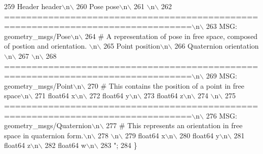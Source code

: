 \begin{DoxyCode}
259 \textcolor{stringliteral}{Header header\(\backslash\)n\(\backslash\)}
260 \textcolor{stringliteral}{Pose pose\(\backslash\)n\(\backslash\)}
261 \textcolor{stringliteral}{\(\backslash\)n\(\backslash\)}
262 \textcolor{stringliteral}{================================================================================\(\backslash\)n\(\backslash\)}
263 \textcolor{stringliteral}{MSG: geometry\_msgs/Pose\(\backslash\)n\(\backslash\)}
264 \textcolor{stringliteral}{# A representation of pose in free space, composed of postion and orientation. \(\backslash\)n\(\backslash\)}
265 \textcolor{stringliteral}{Point position\(\backslash\)n\(\backslash\)}
266 \textcolor{stringliteral}{Quaternion orientation\(\backslash\)n\(\backslash\)}
267 \textcolor{stringliteral}{\(\backslash\)n\(\backslash\)}
268 \textcolor{stringliteral}{================================================================================\(\backslash\)n\(\backslash\)}
269 \textcolor{stringliteral}{MSG: geometry\_msgs/Point\(\backslash\)n\(\backslash\)}
270 \textcolor{stringliteral}{# This contains the position of a point in free space\(\backslash\)n\(\backslash\)}
271 \textcolor{stringliteral}{float64 x\(\backslash\)n\(\backslash\)}
272 \textcolor{stringliteral}{float64 y\(\backslash\)n\(\backslash\)}
273 \textcolor{stringliteral}{float64 z\(\backslash\)n\(\backslash\)}
274 \textcolor{stringliteral}{\(\backslash\)n\(\backslash\)}
275 \textcolor{stringliteral}{================================================================================\(\backslash\)n\(\backslash\)}
276 \textcolor{stringliteral}{MSG: geometry\_msgs/Quaternion\(\backslash\)n\(\backslash\)}
277 \textcolor{stringliteral}{# This represents an orientation in free space in quaternion form.\(\backslash\)n\(\backslash\)}
278 \textcolor{stringliteral}{\(\backslash\)n\(\backslash\)}
279 \textcolor{stringliteral}{float64 x\(\backslash\)n\(\backslash\)}
280 \textcolor{stringliteral}{float64 y\(\backslash\)n\(\backslash\)}
281 \textcolor{stringliteral}{float64 z\(\backslash\)n\(\backslash\)}
282 \textcolor{stringliteral}{float64 w\(\backslash\)n\(\backslash\)}
283 \textcolor{stringliteral}{"};
284   \}
\end{DoxyCode}
